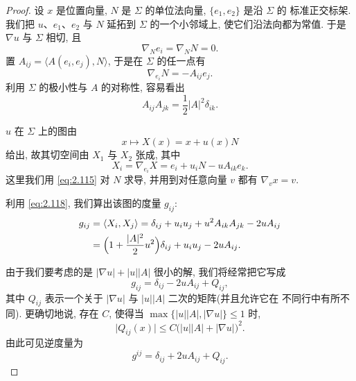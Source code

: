 \begin{proof}
设 $x$ 是位置向量, $N$ 是 $\Sigma$ 的单位法向量, $\{e_1,e_2\}$ 是沿 $\Sigma$ 的
标准正交标架. 我们把 $u$、$e_1$、$e_2$ 与 $N$ 延拓到 $\Sigma$ 的一个小邻域上,
使它们沿法向都为常值. 于是 $\nabla u$ 与 $\Sigma$ 相切, 且
\begin{equation}
\nabla_Ne_i=\nabla_NN=0.
\label{eq:2.114}
\end{equation}
置 $A_{ij}=\langle A(e_i,e_j),N\rangle$, 于是在 $\Sigma$ 的任一点有
\begin{equation}
\nabla_{e_i}N=-A_{ij}e_j.
\label{eq:2.115}
\end{equation}
利用 $\Sigma$ 的极小性与 $A$ 的对称性, 容易看出
\begin{equation}
A_{ij}A_{jk}=\frac12|A|^{2}\delta_{ik}.
\label{eq:2.116}
\end{equation}

$u$ 在 $\Sigma$ 上的图由
\begin{equation}
x\mapsto X(x)=x+u(x)N
\label{eq:2.117}
\end{equation}
给出, 故其切空间由 $X_1$ 与 $X_2$ 张成, 其中
\begin{equation}
X_i=\nabla_{e_i}X=e_i+u_iN-uA_{ik}e_k.
\label{eq:2.118}
\end{equation}
这里我们用 \eqref{eq:2.115} 对 $N$ 求导, 并用到对任意向量 $v$ 都有 $\nabla_vx=v$.

利用 \eqref{eq:2.118}, 我们算出该图的度量 $g_{ij}$:
\begin{equation}
\begin{aligned}
g_{ij}&=\langle X_i,X_j\rangle
 =\delta_{ij}+u_iu_j+u^{2}A_{ik}A_{jk}-2uA_{ij}\\
&=\Bigl(1+\frac{|A|^{2}}{2}u^{2}\Bigr)\delta_{ij}+u_iu_j-2uA_{ij}.
\end{aligned}
\label{eq:2.119}
\end{equation}

由于我们要考虑的是 $|\nabla u|+|u||A|$ 很小的解, 我们将经常把它写成
\begin{equation}
g_{ij}=\delta_{ij}-2uA_{ij}+Q_{ij},
\label{eq:2.120}
\end{equation}
其中 $Q_{ij}$ 表示一个关于 $|\nabla u|$ 与 $|u||A|$ 二次的矩阵(并且允许它在
不同行中有所不同). 更确切地说, 存在 $C$, 使得当
$\max\{|u||A|,|\nabla u|\}\leq1$ 时,
\begin{equation}
\bigl|Q_{ij}(x)\bigr|\leq C\bigl(|u||A|+|\nabla u|\bigr)^{2}.
\label{eq:2.121}
\end{equation}
由此可见逆度量为
\begin{equation}
g^{ij}=\delta_{ij}+2uA_{ij}+Q_{ij}.
\label{eq:2.122}
\end{equation}


\end{proof}
